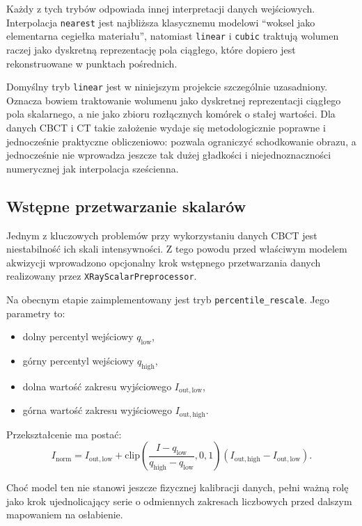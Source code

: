 \documentclass[11pt,a4paper]{article}
\begin{document}
Każdy z tych trybów odpowiada innej interpretacji danych wejściowych.
Interpolacja \texttt{nearest} jest najbliższa klasycznemu modelowi
``woksel jako elementarna cegiełka materiału'', natomiast \texttt{linear}
i \texttt{cubic} traktują wolumen raczej jako dyskretną reprezentację pola ciągłego,
które dopiero jest rekonstruowane w punktach pośrednich.

Domyślny tryb \texttt{linear} jest w niniejszym projekcie szczególnie uzasadniony.
Oznacza bowiem traktowanie wolumenu jako dyskretnej reprezentacji ciągłego pola
skalarnego, a nie jako zbioru rozłącznych komórek o stałej wartości. Dla danych
CBCT i CT takie założenie wydaje się metodologicznie poprawne i jednocześnie
praktyczne obliczeniowo: pozwala ograniczyć schodkowanie obrazu, a jednocześnie
nie wprowadza jeszcze tak dużej gładkości i niejednoznaczności numerycznej jak
interpolacja sześcienna.

\subsection{Wstępne przetwarzanie skalarów}

Jednym z kluczowych problemów przy wykorzystaniu danych CBCT jest niestabilność
ich skali intensywności. Z tego powodu przed właściwym modelem akwizycji
wprowadzono opcjonalny krok wstępnego przetwarzania danych realizowany przez
\texttt{XRayScalarPreprocessor}.

Na obecnym etapie zaimplementowany jest tryb \texttt{percentile\_rescale}.
Jego parametry to:
\begin{itemize}
\item dolny percentyl wejściowy \(q_{\mathrm{low}}\),
\item górny percentyl wejściowy \(q_{\mathrm{high}}\),
\item dolna wartość zakresu wyjściowego \(I_{\mathrm{out,low}}\),
\item górna wartość zakresu wyjściowego \(I_{\mathrm{out,high}}\).
\end{itemize}

Przekształcenie ma postać:
\[
  I_{\mathrm{norm}}=
  I_{\mathrm{out,low}}+
  \mathrm{clip}\!\left(
    \frac{I-q_{\mathrm{low}}}{q_{\mathrm{high}}-q_{\mathrm{low}}},
    0,1
  \right)
  \left(I_{\mathrm{out,high}}-I_{\mathrm{out,low}}\right).
\]

Choć model ten nie stanowi jeszcze fizycznej kalibracji danych, pełni ważną rolę
jako krok ujednolicający serie o odmiennych zakresach liczbowych przed dalszym
mapowaniem na osłabienie.
\end{document}
